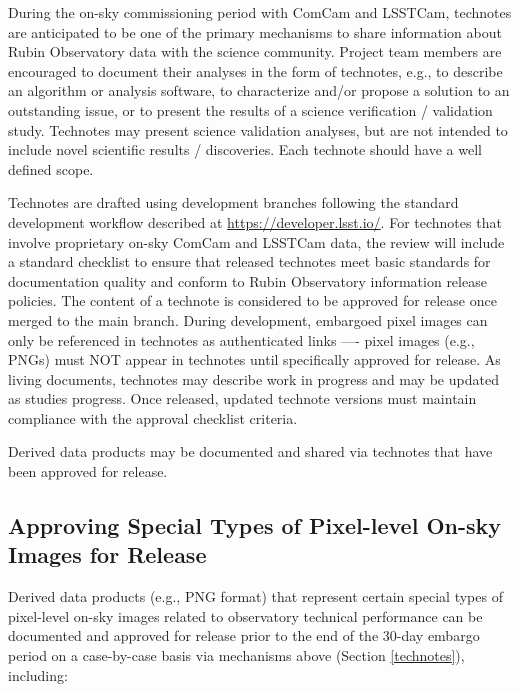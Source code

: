 \documentclass[SE,authoryear,toc]{lsstdoc}
\begin{document}
During the on-sky commissioning period with ComCam and LSSTCam, technotes are anticipated to be one of the primary mechanisms to share information about Rubin Observatory data with the science community.
Project team members are encouraged to document their analyses in the form of technotes, e.g., to describe an algorithm or analysis software, to characterize and/or propose a solution to an outstanding issue, or to present the results of a science verification / validation study.
Technotes may present science validation analyses, but are not intended to include novel scientific results / discoveries.
Each technote should have a well defined scope.

Technotes are drafted using development branches following the standard development workflow described at \url{https://developer.lsst.io/}.
For technotes that involve proprietary on-sky ComCam and LSSTCam data, the review will include a standard checklist to ensure that released technotes meet basic standards for documentation quality and conform to Rubin Observatory information release policies.
The content of a technote is considered to be approved for release once merged to the main branch.
During development, embargoed pixel images can only be referenced in technotes as authenticated links —- pixel images (e.g., PNGs) must NOT appear in technotes until specifically approved for release.
As living documents, technotes may describe work in progress and may be updated as studies progress.
Once released, updated technote versions must maintain compliance with the approval checklist criteria.

Derived data products may be documented and shared via technotes that have been approved for release.

\subsection{Approving Special Types of Pixel-level On-sky Images for Release}
\label{special_classes}

Derived data products (e.g., PNG format) that represent certain special types of pixel-level on-sky images related to observatory technical performance can be documented and approved for release prior to the end of the 30-day embargo period on a case-by-case basis via mechanisms above (Section \ref{technotes}), including:
\end{document}
